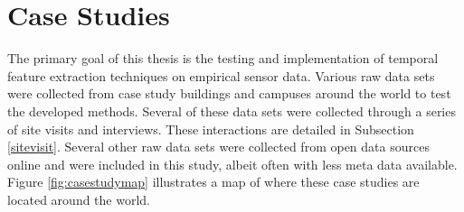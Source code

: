\section{Case Studies}
\label{sec:casestudies}

The primary goal of this thesis is the testing and implementation of temporal feature extraction techniques on empirical sensor data. Various raw data sets were collected from case study buildings and campuses around the world to test the developed methods. Several of these data sets were collected through a series of site visits and interviews. These interactions are detailed in Subsection \ref{sitevisit}. Several other raw data sets were collected from open data sources online and were included in this study, albeit often with less meta data available. Figure \ref{fig:casestudymap} illustrates a map of where these case studies are located around the world.